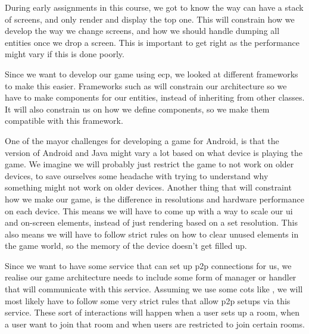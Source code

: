 
During early assignments in this course, we got to know the way \cite{LibGDX} can have a stack of screens, and only render and display the top one. This will constrain how we develop the way we change screens, and how we should handle dumping all entities once we drop a screen. This is important to get right as the performance might vary if this is done poorly.

Since we want to develop our game using \gls{ecp}, we looked at different frameworks to make this easier. Frameworks such as \citep{artemis} will constrain our architecture so we have to make components for our entities, instead of inheriting from other classes.
It will also constrain us on how we define components, so we make them compatible with this framework.

One of the mayor challenges for developing a game for Android, is that the version of Android and Java might vary a lot based on what device is playing the game. We imagine we will probably just restrict the game to not work on older devices, to save ourselves some headache with trying to understand why something might not work on older devices. Another thing that will constraint how we make our game, is the difference in resolutions and hardware performance on each device. This means we will have to come up with a way to scale our \gls{ui} and on-screen elements, instead of just rendering based on a set resolution. This also means we will have to follow strict rules on how to clear unused elements in the game world, so the memory of the device doesn't get filled up.

Since we want to have some service that can set up \gls{p2p} connections for us, we realise our game architecture needs to include some form of manager or handler that will communicate with this service. Assuming we use some \gls{cots} like \cite{gpgs}, we will most likely have to follow some very strict rules that allow \gls{p2p} setups via this service.
These sort of interactions will happen when a user sets up a room, when a user want to join that room and when users are restricted to join certain rooms.
